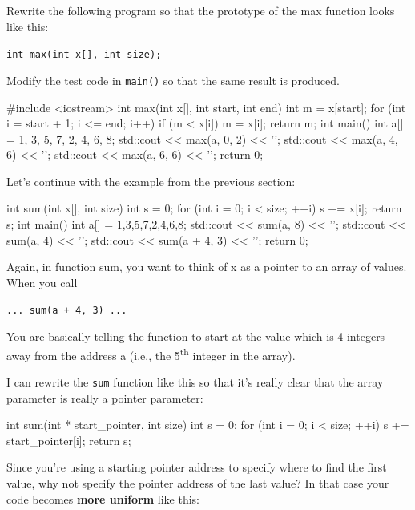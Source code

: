 \begin{ex}
Rewrite the following program so that the prototype of the max
function looks like this:

\verb!int max(int x[], int size);!

Modify the test code in \texttt{main()} so that the same result is
produced.

\begin{consolethree}[escapeinside=||]
#include <iostream>
int max(int x[], int start, int end)
{
    int m = x[start];
    for (int i = start + 1; i <= end; i++)
    {
        if (m < x[i]) m = x[i];
    }
    return m;
}
int main()
{
    int a[] = {1, 3, 5, 7, 2, 4, 6, 8};
    std::cout << max(a, 0, 2) << '\n';
    std::cout << max(a, 4, 6) << '\n';
    std::cout << max(a, 6, 6) << '\n';
    return 0;
}
\end{consolethree}
\end{ex}


\newpage{}

Let's continue with the example from the previous section:

\begin{consolethree}[escapeinside=||]
int sum(int x[], int size)
{
    int s = 0;
    for (int i = 0; i < size; ++i)
    {
        s += x[i];
    }
    return s;
}
int main()
{
    int a[] = {1,3,5,7,2,4,6,8};
    std::cout << sum(a, 8) << '\n';
    std::cout << sum(a, 4) << '\n';
    std::cout << sum(a + 4, 3) << '\n';
    return 0;
}
\end{consolethree}

Again, in function sum, you want to think of x as a pointer to an array
of values. When you call

\verb!... sum(a + 4, 3) ...!

You are basically telling the function to start at the value which is 4
integers away from the address a (i.e., the 5\textsuperscript{th}
integer in the array).

I can rewrite the \texttt{sum} function like this so that it's really
clear that the array parameter is really a pointer parameter:

\begin{consolethree}[escapeinside=||]
int sum(int * start_pointer, int size)
{
    int s = 0;
    for (int i = 0; i < size; ++i)
    {
        s += start_pointer[i];
    }
    return s;
}
\end{consolethree}

Since you're using a starting pointer address to specify where to find
the first value, why not specify the pointer address of the last value?
In that case your code becomes \textbf{more uniform} like this:

